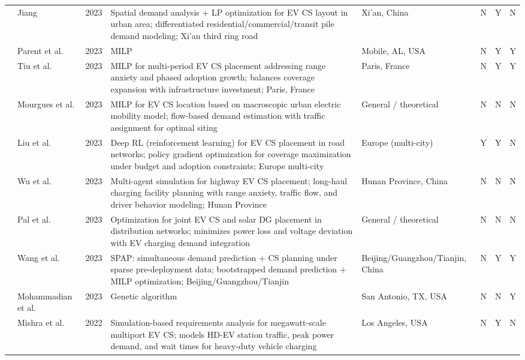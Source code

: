 \documentclass[letterpaper, 12pt, oneside, doublespacing]{Thesis}
\begin{document}
\begin{longtable}{L{0.9cm} L{1.8cm} L{0.7cm} L{2.5cm} L{2.1cm} L{0.7cm} L{0.7cm} L{0.7cm}}
\cite{layout_and_2023} & Jiang & 2023 & Spatial demand analysis + LP optimization for EV CS layout in urban area; differentiated residential/commercial/transit pile demand modeling; Xi'an third ring road & Xi'an, China & N & Y & N \\
\cite{maximum_flow-based_2023} & Parent et al. & 2023 & MILP & Mobile, AL, USA & N & Y & Y \\
\cite{on_the_2023} & Tiu et al. & 2023 & MILP for multi-period EV CS placement addressing range anxiety and phased adoption growth; balances coverage expansion with infrastructure investment; Paris, France & Paris, France & N & Y & Y \\
\cite{optimal_location_2023} & Mourgues et al. & 2023 & MILP for EV CS location based on macroscopic urban electric mobility model; flow-based demand estimation with traffic assignment for optimal siting & General {\slash} theoretical & N & N & N \\
\cite{optimal_placement_2023} & Liu et al. & 2023 & Deep RL (reinforcement learning) for EV CS placement in road networks; policy gradient optimization for coverage maximization under budget and adoption constraints; Europe multi-city & Europe (multi-city) & Y & Y & N \\
\cite{optimizing_electric_2023} & Wu et al. & 2023 & Multi-agent simulation for highway EV CS placement; long-haul charging facility planning with range anxiety, traffic flow, and driver behavior modeling; Hunan Province & Hunan Province, China & N & N & N \\
\cite{placement_of_2023} & Pal et al. & 2023 & Optimization for joint EV CS and solar DG placement in distribution networks; minimizes power loss and voltage deviation with EV charging demand integration & General {\slash} theoretical & N & N & N \\
\cite{spap_simultaneous_2023} & Wang et al. & 2023 & SPAP: simultaneous demand prediction + CS planning under sparse pre-deployment data; bootstrapped demand prediction + MILP optimization; Beijing/Guangzhou/Tianjin & Beijing{\slash}Guangzhou{\slash}Tianjin, China & N & Y & Y \\
\cite{spatial_arbitrage_2023} & Mohammadian et al. & 2023 & Genetic algorithm & San Antonio, TX, USA & N & N & Y \\
\cite{a_framework_2022} & Mishra et al. & 2022 & Simulation-based requirements analysis for megawatt-scale multiport EV CS; models HD-EV station traffic, peak power demand, and wait times for heavy-duty vehicle charging & Los Angeles, USA & N & Y & N \\

\end{longtable}
\end{document}
